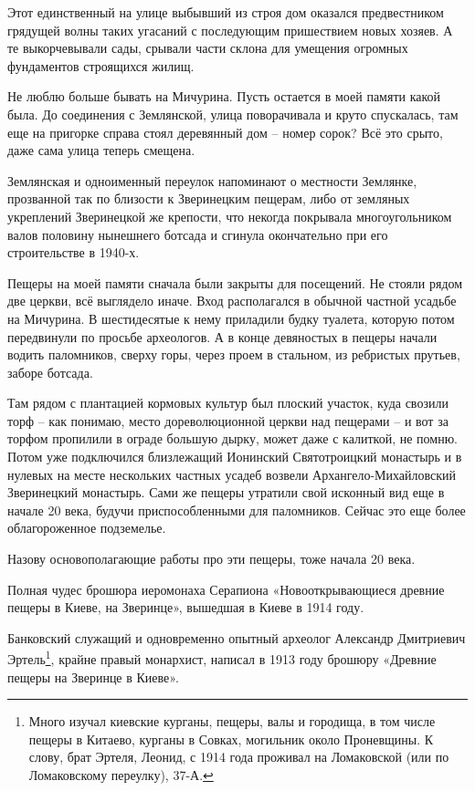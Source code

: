 Этот единственный на улице выбывший из строя дом оказался предвестником грядущей волны таких угасаний с последующим пришествием новых хозяев. А те выкорчевывали сады, срывали части склона для умещения огромных фундаментов строящихся жилищ.

Не люблю больше бывать на Мичурина. Пусть остается в моей памяти какой была. До соединения с Землянской, улица поворачивала и круто спускалась, там еще на пригорке справа стоял деревянный дом – номер сорок? Всё это срыто, даже сама улица теперь смещена.

Землянская и одноименный переулок напоминают о местности Землянке, прозванной так по близости к Зверинецким пещерам, либо от земляных укреплений Зверинецкой же крепости, что некогда покрывала многоугольником валов половину нынешнего ботсада и сгинула окончательно при его строительстве в 1940-х.

Пещеры на моей памяти сначала были закрыты для посещений. Не стояли рядом две церкви, всё выглядело иначе. Вход располагался в обычной частной усадьбе на Мичурина. В шестидесятые к нему приладили будку туалета, которую потом передвинули по просьбе археологов. А в конце девяностых в пещеры начали водить паломников, сверху горы, через проем в стальном, из ребристых прутьев, заборе ботсада.

Там рядом с плантацией кормовых культур был плоский участок, куда свозили торф – как понимаю, место дореволюционной церкви над пещерами – и вот за торфом пропилили в ограде большую дырку, может даже с калиткой, не помню. Потом уже подключился близлежащий Ионинский Святотроицкий монастырь и в нулевых на месте нескольких частных усадеб возвели Архангело-Михайловский Зверинецкий монастырь. Сами же пещеры утратили свой исконный вид еще в начале 20 века, будучи приспособленными для паломников. Сейчас это еще более облагороженное подземелье.

Назову основополагающие работы про эти пещеры, тоже начала 20 века.

Полная чудес брошюра иеромонаха Серапиона «Новооткрывающиеся древние пещеры в Киеве, на Зверинце», вышедшая в Киеве в 1914 году. 

Банковский служащий и одновременно опытный археолог Александр Дмитриевич Эртель\footnote{Много изучал киевские курганы, пещеры, валы и городища, в том числе пещеры в Китаево, курганы в Совках, могильник около Проневщины. К слову, брат Эртеля, Леонид, с 1914 года проживал на Ломаковской (или по Ломаковскому переулку), 37-А.}, крайне правый монархист, написал в 1913 году брошюру «Древние пещеры на Зверинце в Киеве».

